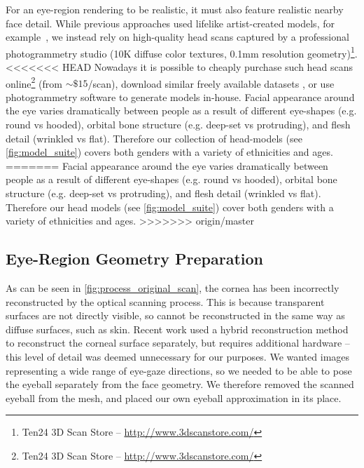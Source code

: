 For an eye-region rendering to be realistic, it must also feature realistic nearby face detail.
While previous approaches used lifelike artist-created models, for example~\cite{swirski2014rendering}, we instead rely on high-quality head scans captured by a professional photogrammetry studio (10K diffuse color textures, 0.1mm resolution geometry)\footnote{Ten24 3D Scan Store -- \url{http://www.3dscanstore.com/}}.
<<<<<<< HEAD
Nowadays it is possible to cheaply purchase such head scans online\footnote{Ten24 3D Scan Store -- \url{http://www.3dscanstore.com/}} (from $\sim\!\$15$/scan), download similar freely available datasets \cite{stratou2011effect}, or use photogrammetry software to generate models in-house.
Facial appearance around the eye varies dramatically between people as a result of different eye-shapes (e.g. round vs hooded), orbital bone structure (e.g. deep-set vs protruding), and flesh detail (wrinkled vs flat). Therefore our collection of head-models (see \autoref{fig:model_suite}) covers both genders with a variety of ethnicities and ages.
=======
Facial appearance around the eye varies dramatically between people as a result of different eye-shapes (e.g. round vs hooded), orbital bone structure (e.g. deep-set vs protruding), and flesh detail (wrinkled vs flat). Therefore our head models (see \autoref{fig:model_suite}) cover both genders with a variety of ethnicities and ages.
>>>>>>> origin/master

\subsection{Eye-Region Geometry Preparation}

As can be seen in \autoref{fig:process_original_scan}, the cornea has been incorrectly reconstructed by the optical scanning process.
This is because transparent surfaces are not directly visible, so cannot be reconstructed in the same way as diffuse surfaces, such as skin.
Recent work used a hybrid reconstruction method to reconstruct the corneal surface separately, but requires additional hardware \cite{berard2014highquality} -- this level of detail was deemed unnecessary for our purposes.
We wanted images representing a wide range of eye-gaze directions, so we needed to be able to pose the eyeball separately from the face geometry.
We therefore removed the scanned eyeball from the mesh, and placed our own eyeball approximation in its place.

